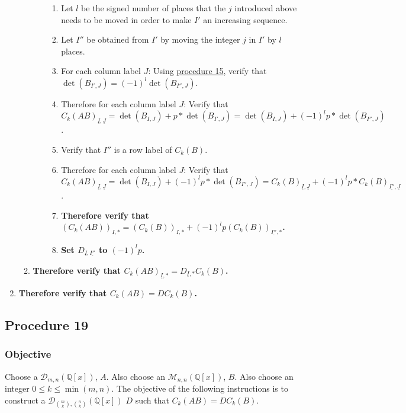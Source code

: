 \documentclass[twocolumn]{article}
\newcommand{\ul}[1]{\underline{#1}}
\begin{document}
\begin{enumerate}
\begin{enumerate}
\begin{enumerate}
							\begin{enumerate}
								\item Let $l$ be the signed number of places that the $j$ introduced above needs to be moved in order to make $I'$ an increasing sequence.
								\item Let $I''$ be obtained from $I'$ by moving the integer $j$ in $I'$ by $l$ places.
								\item For each column label $J$: Using \hyperref[sec:procedure 15]{procedure 15}, verify that $\det(B_{I',J})=(-1)^l\det(B_{I'',J})$.
								\item Therefore for each column label $J$: Verify that ${C_k(AB)}_{\ul{I},\ul{J}}=\det(B_{I,J})+p*\det(B_{I',J})=\det(B_{I,J})+(-1)^lp*\det(B_{I'',J})$.
								\item Verify that $I''$ is a row label of $C_k(B)$.
								\item Therefore for each column label $J$: Verify that ${C_k(AB)}_{\ul{I},\ul{J}}=\det(B_{I,J})+(-1)^lp*\det(B_{I'',J})={C_k(B)}_{\ul{I},\ul{J}}+(-1)^lp*{C_k(B)}_{\ul{I''},\ul{J}}$.
								\item \textbf{Therefore verify that $(C_k(AB))_{\ul{I},*}=(C_k(B))_{\ul{I},*}+(-1)^lp(C_k(B))_{\ul{I''},*}$.}
								\item \textbf{Set $D_{\ul{I},\ul{I''}}$ to $(-1)^lp$.}
							\end{enumerate}
						\end{enumerate}
						\item \textbf{Therefore verify that ${C_k(AB)}_{\ul{I},*}=D_{\ul{I},*}C_k(B)$.}
					\end{enumerate}
					\item \textbf{Therefore verify that $C_k(AB)=DC_k(B)$.}
				\end{enumerate}
		\subsection{Procedure 19}\label{sec:procedure 19}
			\subsubsection{Objective}
				Choose a $\mathcal{D}_{m,n}(\mathbb{Q}[x])$, $A$. Also choose an $\mathcal{M}_{n,n}(\mathbb{Q}[x])$, $B$. Also choose an integer $0\le k\le\min(m,n)$. The objective of the following instructions is to construct a $\mathcal{D}_{\binom{m}{k},\binom{n}{k}}(\mathbb{Q}[x])$ $D$ such that $C_k(AB)=DC_k(B)$.
\end{document}
